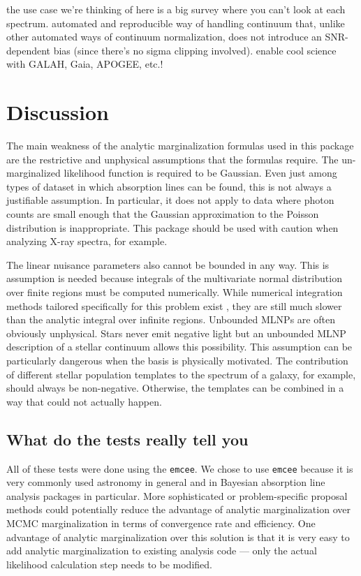 \documentclass[manuscript]{aastex62}
\begin{document}
the use case we're thinking of here is a big survey where you can't look at each spectrum.
automated and reproducible way of handling continuum that, unlike other automated ways of continuum normalization, does not introduce an SNR-dependent bias (since there's no sigma clipping involved).
enable cool science with GALAH, Gaia, APOGEE, etc.!

\section{Discussion}
\label{sec:discussion}
The main weakness of the analytic marginalization formulas used in this package are the restrictive and unphysical assumptions that the formulas require.
The un-marginalized likelihood function is required to be Gaussian.
Even just among types of dataset in which absorption lines can be found, this is not always a justifiable assumption.
In particular, it does not apply to data where photon counts are small enough that the Gaussian approximation to the Poisson distribution is inappropriate.
This package should be used with caution when analyzing X-ray spectra, for example.

The linear nuisance parameters also cannot be bounded in any way.
This is assumption is needed because integrals of the multivariate normal distribution over finite regions must be computed numerically.
While numerical integration methods tailored specifically for this problem exist \citep{Genz:2009jp}, they are still much slower than the analytic integral over infinite regions.
Unbounded MLNPs are often obviously unphysical.
Stars never emit negative light but an unbounded MLNP description of a stellar continuum allows this possibility.
This assumption can be particularly dangerous when the basis is physically motivated.
The contribution of different stellar population templates to the spectrum of a galaxy, for example, should always be non-negative.
Otherwise, the templates can be combined in a way that could not actually happen.

\subsection{What do the tests really tell you}

All of these tests were done using the \texttt{emcee}.
We chose to use \texttt{emcee} because it is very commonly used astronomy in general and in Bayesian absorption line analysis packages in particular.
More sophisticated or problem-specific proposal methods could potentially reduce the advantage of analytic marginalization over MCMC marginalization in terms of convergence rate and efficiency.
One advantage of analytic marginalization over this solution is that it is very easy to add analytic marginalization to existing analysis code --- only the actual likelihood calculation step needs to be modified.
\end{document}
